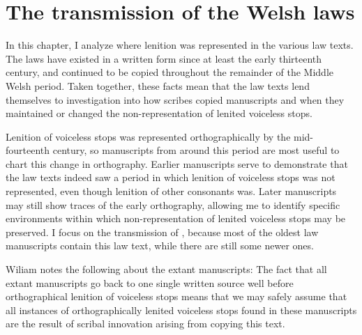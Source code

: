 \chapter{The transmission of the Welsh laws}
\label{cha:welsh-laws}

In this chapter, I analyze where lenition was represented in the various law texts.
The laws have existed in a written form since at least the early thirteenth century, and continued to be copied throughout the remainder of the Middle Welsh period. Taken together, these facts mean that the law texts lend themselves to investigation into how scribes copied manuscripts and when they maintained or changed the non-representation of lenited voiceless stops.

Lenition of voiceless stops was represented orthographically by the mid-fourteenth century, so manuscripts from around this period are most useful to chart this change in orthography.
Earlier manuscripts serve to demonstrate that the law texts indeed saw a period in which lenition of voiceless stops was not represented, even though lenition of other consonants was.
Later manuscripts may still show traces of the early orthography, allowing me to identify specific environments within which non-representation of lenited voiceless stops may be preserved.
I focus on the transmission of , because most of the oldest law manuscripts contain this law text, while there are still some newer ones.
 
Wiliam notes the following about the extant manuscripts:
The fact that all extant manuscripts go back to one single written source well before orthographical lenition of voiceless stops means that we may safely assume that all instances of orthographically lenited voiceless stops found in these manuscripts are the result of scribal innovation arising from copying this text. 


